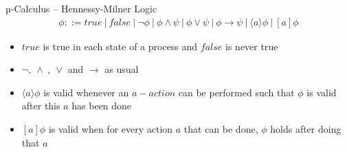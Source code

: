 \documentclass[aspectratio=1610]{beamer}
\begin{document}
  \begin{frame}{µ-Calculus – Hennessy-Milner Logic}
    \begin{align*}
      \phi ::= \mathit{true}\ |\ \mathit{false}\ |\ \neg \phi\ |\ \phi \land \psi\ |\ \phi \lor \psi\ |\ \phi \to \psi\ |\ \langle a \rangle \phi \ |\ [a]\phi
    \end{align*}
    \begin{itemize}
      \item $\mathit{true}$ is true in each state of a process and $\mathit{false}$ is never true
      \item $\neg ,\ \land\ ,\ \lor$ and $\to$ as usual
      \item $\langle a \rangle \phi$ is valid whenever an $a-action$ can be performed such that $\phi$ is valid after this $a$ has been done
      \item $[a]\phi$ is valid when for every action $a$ that can be done, $\phi$ holds after doing that $a$
    \end{itemize}
  \end{frame}
\end{document}

